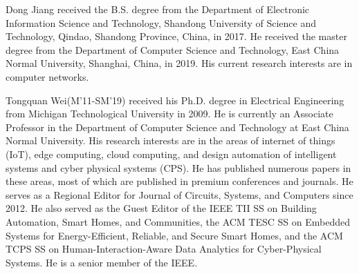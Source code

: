 \documentclass{ieeeaccess}
\theoremstyle{definition}
\begin{document}
\begin{IEEEbiography}{Dong Jiang}
    received the B.S. degree from the Department of Electronic Information Science and Technology, Shandong University of Science and Technology, Qindao, Shandong Province, China, in 2017. He received the master degree from the Department of Computer Science and Technology, East China Normal University, Shanghai, China, in 2019. His current research interests are in computer networks.
\end{IEEEbiography}

\begin{IEEEbiography}{Tongquan Wei(M'11-SM'19)}
    received his Ph.D. degree in Electrical Engineering from Michigan Technological University in 2009. He is currently an Associate Professor in the Department of Computer Science and Technology at East China Normal University. His research interests are in the areas of internet of things (IoT), edge computing, cloud computing, and design automation of intelligent systems and cyber physical systems (CPS). He has published numerous papers in these areas, most of which are published in premium conferences and journals. He serves as a Regional Editor for Journal of Circuits, Systems, and Computers since 2012. He also served as the Guest Editor of the IEEE TII SS on Building Automation, Smart Homes, and Communities, the ACM TESC SS on Embedded Systems for Energy-Efficient, Reliable, and Secure Smart Homes, and the ACM TCPS SS on Human-Interaction-Aware Data Analytics for Cyber-Physical Systems. He is a senior member of the IEEE.
\end{IEEEbiography}
\end{document}

